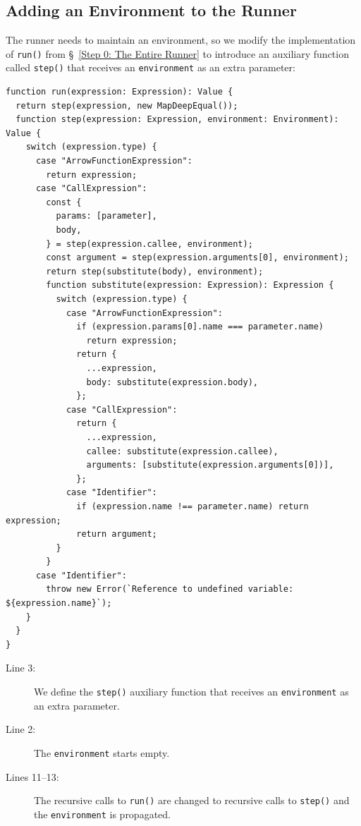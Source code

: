 \documentclass[12pt, oneside]{book}
\begin{document}
\subsection{Adding an Environment to the Runner}

The runner needs to maintain an environment, so we modify the implementation of \texttt{run()} from §~\ref{Step 0: The Entire Runner} to introduce an auxiliary function called \texttt{step()} that receives an \texttt{environment} as an extra parameter:

\begin{verbatim}
function run(expression: Expression): Value {
  return step(expression, new MapDeepEqual());
  function step(expression: Expression, environment: Environment): Value {
    switch (expression.type) {
      case "ArrowFunctionExpression":
        return expression;
      case "CallExpression":
        const {
          params: [parameter],
          body,
        } = step(expression.callee, environment);
        const argument = step(expression.arguments[0], environment);
        return step(substitute(body), environment);
        function substitute(expression: Expression): Expression {
          switch (expression.type) {
            case "ArrowFunctionExpression":
              if (expression.params[0].name === parameter.name)
                return expression;
              return {
                ...expression,
                body: substitute(expression.body),
              };
            case "CallExpression":
              return {
                ...expression,
                callee: substitute(expression.callee),
                arguments: [substitute(expression.arguments[0])],
              };
            case "Identifier":
              if (expression.name !== parameter.name) return expression;
              return argument;
          }
        }
      case "Identifier":
        throw new Error(`Reference to undefined variable: ${expression.name}`);
    }
  }
}
\end{verbatim}

\begin{description}
\item [Line 3:] We define the \texttt{step()} auxiliary function that receives an \texttt{environment} as an extra parameter.

\item [Line 2:] The \texttt{environment} starts empty.

\item [Lines 11–13:] The recursive calls to \texttt{run()} are changed to recursive calls to \texttt{step()} and the \texttt{environment} is propagated.
\end{description}
\end{document}
